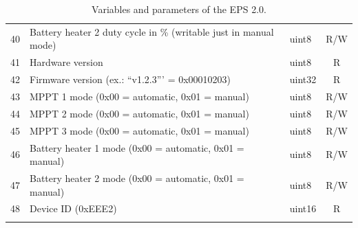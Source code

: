 \begin{longtable}[c]{cL{0.72\textwidth}lc}
    40  & Battery heater 2 duty cycle in \% (writable just in manual mode)  & uint8  & R/W \\
    41  & Hardware version                                                  & uint8  & R \\
    42  & Firmware version (ex.: ``v1.2.3''' = 0x00010203)                  & uint32 & R \\
    43  & MPPT 1 mode (0x00 = automatic, 0x01 = manual)                     & uint8  & R/W \\
    44  & MPPT 2 mode (0x00 = automatic, 0x01 = manual)                     & uint8  & R/W \\
    45  & MPPT 3 mode (0x00 = automatic, 0x01 = manual)                     & uint8  & R/W \\
    46  & Battery heater 1 mode (0x00 = automatic, 0x01 = manual)           & uint8  & R/W \\
    47  & Battery heater 2 mode (0x00 = automatic, 0x01 = manual)           & uint8  & R/W \\
    48  & Device ID (0xEEE2)                                                & uint16 & R \\
    \bottomrule[1.5pt]
    \caption{Variables and parameters of the EPS 2.0.}
    \label{tab:eps2-variables}
\end{longtable}

